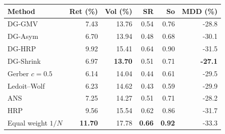 \begin{tabular}{@{}lrrrrr@{}}
\toprule
Method & Ret (\%) & Vol (\%) & SR & So & MDD (\%)\\
\midrule
DG-GMV & 7.43 & 13.76 & 0.54 & 0.76 & -28.8\\
DG-Asym & 6.70 & 13.94 & 0.48 & 0.68 & -30.1\\
DG-HRP & 9.92 & 15.41 & 0.64 & 0.90 & -31.5\\
DG-Shrink & 6.97 & \textbf{13.70} & 0.51 & 0.71 & \textbf{-27.1}\\
\addlinespace[2pt]
Gerber $c{=}0.5$ & 6.14 & 14.04 & 0.44 & 0.61 & -29.5\\
Ledoit--Wolf & 6.23 & 14.62 & 0.43 & 0.59 & -29.9\\
ANS & 7.25 & 14.27 & 0.51 & 0.71 & -28.2\\
HRP & 9.56 & 15.54 & 0.62 & 0.86 & -31.7\\
Equal weight $1/N$ & \textbf{11.70} & 17.78 & \textbf{0.66} & \textbf{0.92} & -33.3\\
\bottomrule
\end{tabular}
